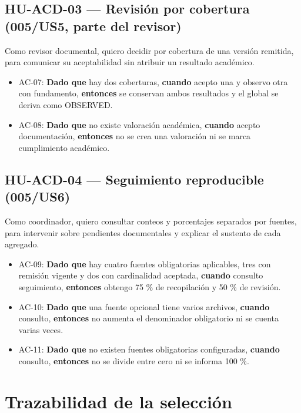 \documentclass[12pt,a4paper]{report}
\providecommand{\tightlist}{\setlength{\itemsep}{0pt}\setlength{\parskip}{0pt}}
\begin{document}
\subsection{HU-ACD-03 --- Revisión por cobertura (005/US5, parte del
revisor)}\label{hu-acd-03-revisiuxf3n-por-cobertura-005us5-parte-del-revisor}

Como revisor documental, quiero decidir por cobertura de una versión
remitida, para comunicar su aceptabilidad sin atribuir un resultado
académico.

\begin{itemize}
\tightlist
\item
  AC-07: \textbf{Dado que} hay dos coberturas, \textbf{cuando} acepto
  una y observo otra con fundamento, \textbf{entonces} se conservan
  ambos resultados y el global se deriva como OBSERVED.
\item
  AC-08: \textbf{Dado que} no existe valoración académica,
  \textbf{cuando} acepto documentación, \textbf{entonces} no se crea una
  valoración ni se marca cumplimiento académico.
\end{itemize}

\subsection{HU-ACD-04 --- Seguimiento reproducible
(005/US6)}\label{hu-acd-04-seguimiento-reproducible-005us6}

Como coordinador, quiero consultar conteos y porcentajes separados por
fuentes, para intervenir sobre pendientes documentales y explicar el
sustento de cada agregado.

\begin{itemize}
\tightlist
\item
  AC-09: \textbf{Dado que} hay cuatro fuentes obligatorias aplicables,
  tres con remisión vigente y dos con cardinalidad aceptada,
  \textbf{cuando} consulto seguimiento, \textbf{entonces} obtengo 75 \%
  de recopilación y 50 \% de revisión.
\item
  AC-10: \textbf{Dado que} una fuente opcional tiene varios archivos,
  \textbf{cuando} consulto, \textbf{entonces} no aumenta el denominador
  obligatorio ni se cuenta varias veces.
\item
  AC-11: \textbf{Dado que} no existen fuentes obligatorias configuradas,
  \textbf{cuando} consulto, \textbf{entonces} no se divide entre cero ni
  se informa 100 \%.
\end{itemize}

\section{Trazabilidad de la
selección}\label{trazabilidad-de-la-selecciuxf3n}
\end{document}
